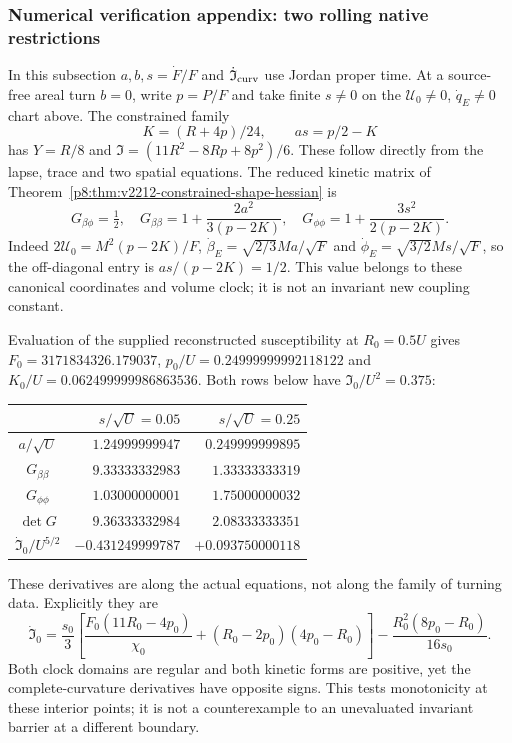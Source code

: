 \documentclass[12pt,a4paper]{article}
\begin{document}
\subsubsection{Numerical verification appendix: two rolling native restrictions}
\label{p8:subsec:v2212-rolling-verification}
In this subsection $a,b,s=\dot F/F$ and
$\dot{\mathfrak I}_{\rm curv}$ use Jordan proper time. At a source-free
areal turn $b=0$, write $p=P/F$ and take finite $s\ne0$ on the
$\mathcal U_0\ne0$, $\dot q_E\ne0$ chart above. The constrained family
\[
 K=(R+4p)/24,\qquad as=p/2-K
\]
has $Y=R/8$ and
$\mathfrak I=(11R^2-8Rp+8p^2)/6$. These follow directly from the
lapse, trace and two spatial equations. The reduced kinetic matrix of
Theorem~\ref{p8:thm:v2212-constrained-shape-hessian} is
\begin{equation}
\label{p8:eq:v2212-turn-kinetic-matrix}
 G_{\beta\phi}=\tfrac12,\quad
 G_{\beta\beta}=1+\frac{2a^2}{3(p-2K)},\quad
 G_{\phi\phi}=1+\frac{3s^2}{2(p-2K)}.
\end{equation}
Indeed $2\mathcal U_0=M^2(p-2K)/F$,
$\dot\beta_E=\sqrt{2/3}Ma/\sqrt F$ and
$\dot\phi_E=\sqrt{3/2}Ms/\sqrt F$, so the off-diagonal entry is
$as/(p-2K)=1/2$. This value belongs to these canonical coordinates and
volume clock; it is not an invariant new coupling constant.

Evaluation of the supplied reconstructed susceptibility at $R_0=0.5U$
gives $F_0=3171834326.179037$,
$p_0/U=0.24999999992118122$ and
$K_0/U=0.062499999986863536$. Both rows below have
$\mathfrak I_0/U^2=0.375$:
\begin{center}
\begin{tabular}{c|rr}
 & $s/\sqrt U=0.05$ & $s/\sqrt U=0.25$\\\hline
 $a/\sqrt U$ & $1.24999999947$ & $0.249999999895$\\
 $G_{\beta\beta}$ & $9.33333332983$ & $1.33333333319$\\
 $G_{\phi\phi}$ & $1.03000000001$ & $1.75000000032$\\
 $\det G$ & $9.36333332984$ & $2.08333333351$\\
 $\dot{\mathfrak I}_0/U^{5/2}$ & $-0.431249999787$ & $+0.093750000118$
\end{tabular}
\end{center}
These derivatives are along the actual equations, not along the family
of turning data. Explicitly they are
\[
 \dot{\mathfrak I}_0=
 \frac{s_0}{3}\left[
 \frac{F_0(11R_0-4p_0)}{\chi_0}
 +(R_0-2p_0)(4p_0-R_0)\right]
 -\frac{R_0^2(8p_0-R_0)}{16s_0}.
\]
Both clock domains are regular and both kinetic forms are positive,
yet the complete-curvature derivatives have opposite signs. This tests
monotonicity at these interior points; it is not a counterexample to an
unevaluated invariant barrier at a different boundary.
\end{document}
